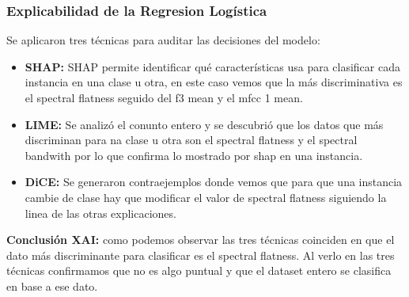 \subsubsection*{Explicabilidad de la Regresion Logística}

Se aplicaron tres técnicas para auditar las decisiones del modelo:

\begin{itemize}
    \item \textbf{SHAP:} SHAP permite identificar qué características usa para clasificar cada instancia en una clase u otra, en este caso vemos que la más discriminativa es el spectral flatness seguido del f3 mean y el mfcc 1 mean.
    \item \textbf{LIME:} Se analizó el conunto entero y se descubrió que los datos que más discriminan para na clase u otra son el spectral flatness y el spectral bandwith por lo que confirma lo mostrado por shap en una instancia.
    \item \textbf{DiCE:} Se generaron contraejemplos donde vemos que para que una instancia cambie de clase hay que modificar el valor de spectral flatness siguiendo la linea de las otras explicaciones.
\end{itemize}
\textbf{Conclusión XAI:} como podemos observar las tres técnicas coinciden en que el dato más discriminante para clasificar es el spectral flatness. Al verlo en las tres técnicas confirmamos que no es algo puntual y que el dataset entero se clasifica en base a ese dato.
